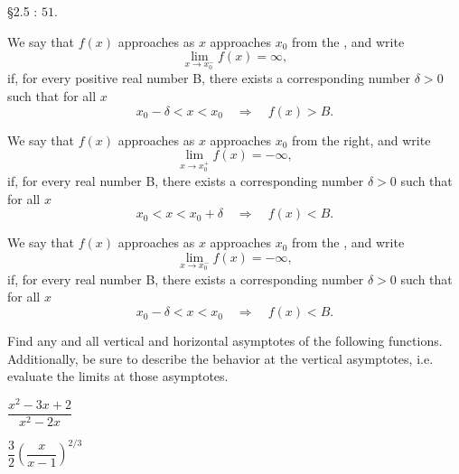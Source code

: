 \documentclass{hwset}
\begin{document}
\begin{problem}[2.] \S 2.5 : $51$.
\end{problem}
\be
	\item
	\begin{solution}
		We say that $f(x)$ approaches  as $x$ approaches $x_0$ from the
		, and write
		\begin{equation*}
			\lim_{x\to x_0^-} f(x) = \infty,
		\end{equation*}
		if, for every positive real number B, there exists a corresponding number
		$\delta>0$ such that for all $x$
		\begin{equation*}
			x_0 - \delta < x < x_0 \quad \Rightarrow \quad f(x) > B.
		\end{equation*}
	\end{solution}
	\item
	\begin{solution}
		We say that $f(x)$ approaches  as $x$ approaches
		$x_0$ from the right, and write
		\begin{equation*}
			\lim_{x\to x_0^+} f(x) = -\infty,
		\end{equation*}
		if, for every  real number B, there exists a corresponding
		number $\delta>0$ such that for all $x$
		\begin{equation*}
			x_0 < x < x_0 + \delta \quad \Rightarrow \quad f(x) < B.
		\end{equation*}
	\end{solution}
	\item
	\begin{solution}
		We say that $f(x)$ approaches  as $x$ approaches
		$x_0$ from the , and write
		\begin{equation*}
			\lim_{x\to x_0^-} f(x) = -\infty,
		\end{equation*}
		if, for every  real number B, there exists a corresponding
		number $\delta>0$ such that for all $x$
		\begin{equation*}
			x_0 - \delta < x < x_0 \quad \Rightarrow \quad f(x) < B.
		\end{equation*}
	\end{solution}
\ee

\begin{problem}[3.]
	Find any and all vertical and horizontal asymptotes of the following
	functions. Additionally, be sure to describe the behavior at the vertical
	asymptotes, i.e. evaluate the limits at those asymptotes. 
	\be
		\item $\dfrac{x^2-3x+2}{x^2-2x}$
		\item $\dfrac{3}{2} \left(\dfrac{x}{x-1}\right)^{2/3}$
	\ee
\end{problem}
\end{document}
